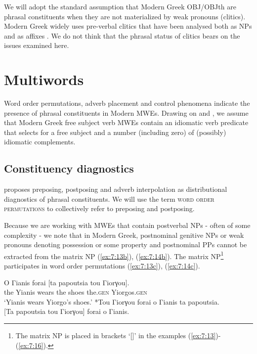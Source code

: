 \documentclass[output=paper]{langsci/langscibook}
\begin{document}
We will adopt the standard assumption that Modern Greek OBJ/OBJth  are phrasal constituents when they are not materialized by weak pronouns (clitics). Modern Greek widely uses pre-verbal clitics that have been analysed both as NPs and as affixes \citep{joseph89}. We do not think that the phrasal status of clitics bears on the issues examined here.

\section{Multiwords}
\label{sec:2}

Word order permutations, adverb placement and control phenomena indicate the presence of phrasal constituents in Modern  MWEs. Drawing on \citet{kaysagidioms} and \cite{Samaridi:Markantonatou:14}, we assume that Modern Greek free subject verb MWEs contain an idiomatic verb predicate that selects for a free subject and a number (including zero) of (possibly) idiomatic complements. 

\subsection{Constituency diagnostics}

\citet{radford1988} proposes preposing, postposing and adverb interpolation as distributional diagnostics of phrasal constituents. We will use the term \textsc{word order permutations} to collectively refer to preposing and postposing. 

Because we are working with MWEs that contain postverbal NPs - often of some complexity - we note that in Modern Greek, postnominal genitive NPs or weak pronouns denoting possession or some property and postnominal PPs cannot be extracted from the matrix NP (\ref{ex:7:13b}), (\ref{ex:7:14b}). The matrix NP\footnote{The matrix NP is placed in brackets `[]' in the examples (\ref{ex:7:13})-(\ref{ex:7:16}).} participates in word order permutations (\ref{ex:7:13c}), (\ref{ex:7:14c}). 

\begin{exe}
\ex \label{ex:7:13}
\begin{xlist}
\ex \label{ex:7:13a}
\gll O Γianis forai [ta papoutsia tou Γiorγou].\\
                               the Yianis wears the shoes the.\textsc{gen} Yiorgos.\textsc{gen}\\
\glt                `Yianis wears Yiorgo’s shoes.'
\ex \label{ex:7:13b}
*Tou Γiorγou forai o Γianis  ta papoutsia.\\
\ex \label{ex:7:13c}
{[}Ta papoutsia tou Γiorγou{]} forai o Γianis.\\
\end{xlist}
\end{exe}
\end{document}
